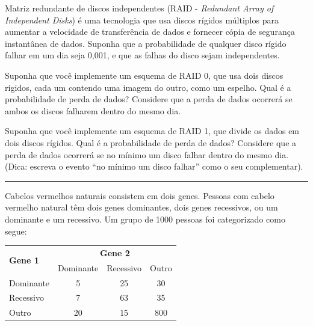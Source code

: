 \documentclass[a4paper,11pt,fleqn]{article}\usepackage[]{graphicx}\usepackage[]{color}
\theoremstyle{definition}
\begin{document}
\begin{compactenum}
\item Matriz redundante de discos independentes (RAID -
  \textit{Redundant Array of Independent Disks}) é uma tecnologia que
  usa discos rígidos múltiplos para aumentar a velocidade de
  transferência de dados e fornecer cópia de segurança instantânea de
  dados. Suponha que a probabilidade de qualquer disco rígido falhar em
  um dia seja 0,001, e que as falhas do disco sejam independentes.
  \begin{compactenum}
  \item Suponha que você implemente um esquema de RAID 0, que usa dois
    discos rígidos, cada um contendo uma imagem do outro, como um
    espelho. Qual é a probabilidade de perda de dados? Considere que a
    perda de dados ocorrerá se ambos os discos falharem dentro do mesmo
    dia.
  \item Suponha que você implemente um esquema de RAID 1, que divide os
    dados em dois discos rígidos. Qual é a probabilidade de perda de
    dados? Considere que a perda de dados ocorrerá se no mínimo um disco
    falhar dentro do mesmo dia. (Dica: escreva o evento ``no mínimo um
    disco falhar'' como o seu complementar).
  \end{compactenum}

\vspace{0.3cm}
\hrule
\vspace{0.3cm}

\item Cabelos vermelhos naturais consistem em dois genes. Pessoas com
  cabelo vermelho natural têm dois genes dominantes, dois genes
  recessivos, ou um dominante e um recessivo. Um grupo de 1000 pessoas
  foi categorizado como segue:
  \begin{table}[!h]
    \centering
    \begin{tabular}{lccc}
      \hline
      \multirow{2}{*}{\textbf{Gene 1}}
      & \multicolumn{3}{c}{\textbf{Gene 2}} \\
      \cline{2-4}
                & Dominante      & Recessivo & Outro  \\
      \hline
      Dominante     & 5           & 25 & 30           \\
      Recessivo    & 7           & 63 & 35           \\
      Outro    & 20           & 15 & 800   \\
      \hline
    \end{tabular}
  \end{table}


\end{compactenum}
\end{document}
